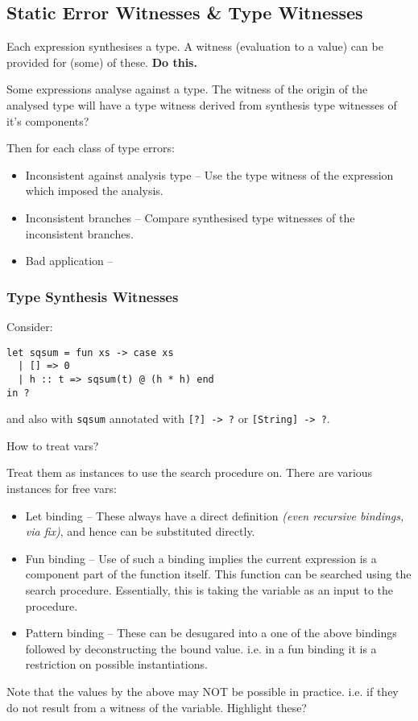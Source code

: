 \subsection{Static Error Witnesses \& Type Witnesses}
Each expression synthesises a type. A witness (evaluation to a value) can be provided for (some) of these. \textbf{Do this.}\par 
Some expressions analyse against a type. The witness of the origin of the analysed type will have a type witness derived from synthesis type witnesses of it's components?\par
Then for each class of type errors:
\begin{itemize}
\item Inconsistent against analysis type -- Use the type witness of the expression which imposed the analysis.
\item Inconsistent branches -- Compare synthesised type witnesses of the inconsistent branches.
\item Bad application -- 
\end{itemize}

\subsubsection{Type Synthesis Witnesses}
Consider:
\begin{verbatim}
let sqsum = fun xs -> case xs 
  | [] => 0 
  | h :: t => sqsum(t) @ (h * h) end 
in ?
\end{verbatim}
and also with \texttt{sqsum} annotated with \texttt{[?] -> ?} or \texttt{[String] -> ?}.\\ \par
How to treat vars? \par 
Treat them as instances to use the search procedure on. There are various instances for free vars: 
\begin{itemize}
\item Let binding -- These always have a direct definition \textit{(even recursive bindings, via fix)}, and hence can be substituted directly.
\item Fun binding -- Use of such a binding implies the current expression is a component part of the function itself. This function can be searched using the search procedure. Essentially, this is taking the variable as an input to the procedure.
\item Pattern binding -- These can be desugared into a one of the above bindings followed by deconstructing the bound value. i.e. in a fun binding it is a restriction on possible instantiations.
\end{itemize}
Note that the values by the above may NOT be possible in practice. i.e. if they do not result from a witness of the variable. Highlight these?

